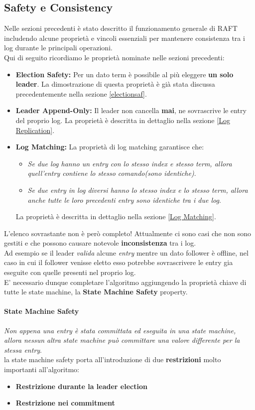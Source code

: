 \subsection{Safety e Consistency}
Nelle sezioni precedenti è stato descritto il funzionamento generale di RAFT includendo alcune proprietà e vincoli essenziali per mantenere consistenza tra i log durante le principali operazioni.\\
Qui di seguito ricordiamo le proprietà nominate nelle sezioni precedenti:

\begin{itemize}
	\item{\textbf{Election Safety:}} 
  Per un dato term è possibile al più eleggere \textbf{un solo leader}.
	La dimostrazione di questa proprietà è già stata discussa precedentemente nella sezione \ref{electionsaf}.
	\item{\textbf{Leader Append-Only:}}
  Il leader non cancella \textbf{mai}, ne sovrascrive le entry del proprio log.
  La proprietà è descritta in dettaglio nella sezione \ref{Log Replication}.
	\item{\textbf{Log Matching:}}
  La proprietà di log matching garantisce che:
	\begin{itemize}
		\item{\emph{Se due log hanno un entry con lo stesso index e stesso term, allora quell'entry contiene lo stesso comando(sono identiche)}}.
		\item{\emph{Se due \textit{entry} in log diversi hanno lo stesso index e lo stesso term, allora anche tutte le loro precedenti entry sono identiche tra i due log}}.
	\end{itemize}
	La proprietà è descritta in dettaglio nella sezione \ref{Log Matching}.
\end{itemize}
L'elenco sovrastante non è però completo! Attualmente ci sono casi che non sono gestiti e che possono causare notevole \textbf{inconsistenza} tra i log.\\
Ad esempio se il leader \textit{valida} alcune \textit{entry} mentre un dato follower è offline, nel caso in cui il follower venisse eletto esso potrebbe sovrascrivere le entry gia eseguite con quelle presenti nel proprio log.\\
E' necessario dunque completare l'algoritmo aggiungendo la proprietà chiave di tutte le state machine, la \textbf{State Machine Safety} property. 

  \paragraph{State Machine Safety}
  \emph{Non appena una entry è stata committata ed eseguita in una state machine, allora nessun altra state machine può committare una valore differente per la stessa entry}.\\
  la state machine safety porta all'introduzione di due \textbf{restrizioni} molto importanti all'algoritmo:
  \begin{itemize}
    \item{\textbf{Restrizione durante la leader election}}
    \item{\textbf{Restrizione nei commitment}}
  \end{itemize}


